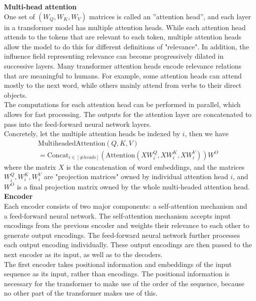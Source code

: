 \textbf{Multi-head attention} \\
One set of \(\left( W_Q, W_K, W_V \right)\) matrices is called an ''attention head'', and each layer in a transformer model has multiple attention heads. While each attention head attends to the tokens that are relevant to each token, multiple attention heads allow the model to do this for different definitions of "relevance". In addition, the influence field representing relevance can become progressively dilated in successive layers. Many transformer attention heads encode relevance relations that are meaningful to humans. For example, some attention heads can attend mostly to the next word, while others mainly attend from verbs to their direct objects.
\\

The computations for each attention head can be performed in parallel, which allows for fast processing. The outputs for the attention layer are concatenated to pass into the feed-forward neural network layers.
\\

Concretely, let the multiple attention heads be indexed by \(i\), then we have
\begin{multline}
\text{MultiheadedAttention}(Q, K, V) \\ =  \text{Concat}_{i \in [\# heads]}(\text{Attention}(XW^Q_i, XW^K_i, XW^V_i)) W^O
\end{multline}
where the matrix \(X\) is the concatenation of word embeddings, and the matrices \(W^Q_i, W^K_i, W^V_i\) are "projection matrices" owned by individual attention head \(i\), and \(W^O\) is a final projection matrix owned by the whole multi-headed attention head.
\\

\textbf{Encoder}\\
Each encoder consists of two major components: a self-attention mechanism and a feed-forward neural network. The self-attention mechanism accepts input encodings from the previous encoder and weights their relevance to each other to generate output encodings. The feed-forward neural network further processes each output encoding individually. These output encodings are then passed to the next encoder as its input, as well as to the decoders.
\\

The first encoder takes positional information and embeddings of the input sequence as its input, rather than encodings. The positional information is necessary for the transformer to make use of the order of the sequence, because no other part of the transformer makes use of this.
\\

